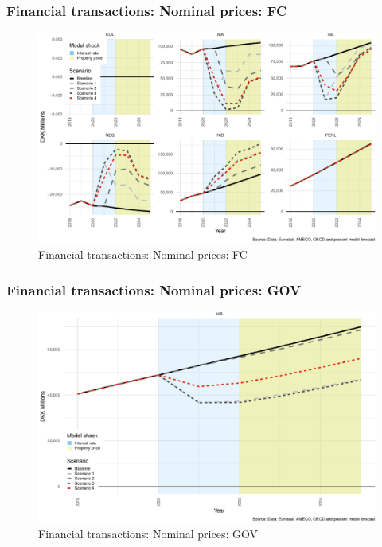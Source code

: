 \documentclass[
]{book}
\begin{document}
\hypertarget{financial-transactions-nominal-prices-fc}{%
\subsubsection{Financial transactions: Nominal prices: FC}\label{financial-transactions-nominal-prices-fc}}

\begin{figure}
\centering
\includegraphics{figures/fl-fi-sfc-plot-fin-tr-FC-1.pdf}
\caption{\label{fig:fl-fi-sfc-plot-fin-tr-FC}Financial transactions: Nominal prices: FC}
\end{figure}

\hypertarget{financial-transactions-nominal-prices-gov}{%
\subsubsection{Financial transactions: Nominal prices: GOV}\label{financial-transactions-nominal-prices-gov}}

\begin{figure}
\centering
\includegraphics{figures/fl-fi-sfc-plot-fin-tr-GOV-1.pdf}
\caption{\label{fig:fl-fi-sfc-plot-fin-tr-GOV}Financial transactions: Nominal prices: GOV}
\end{figure}
\end{document}
